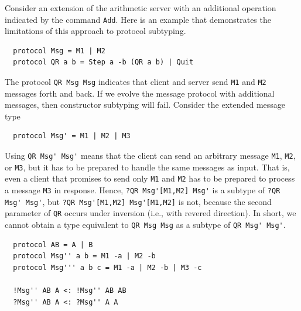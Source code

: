 Consider an extension of the arithmetic server with an additional
operation indicated by the command \lstinline+Add+.
Here is an example that demonstrates the limitations of this approach
to protocol subtyping.
\begin{lstlisting}
  protocol Msg = M1 | M2
  protocol QR a b = Step a -b (QR a b) | Quit
\end{lstlisting}
The protocol \lstinline+QR Msg Msg+ indicates that client and server
send \lstinline+M1+ and \lstinline+M2+ messages forth and back. If we
evolve the message protocol with additional messages, then constructor
subtyping will fail. Consider the extended message type
\begin{lstlisting}
  protocol Msg' = M1 | M2 | M3
\end{lstlisting}
Using \lstinline+QR Msg' Msg'+ means that the client can send an
arbitrary message \lstinline+M1+, \lstinline+M2+, or \lstinline+M3+,
but it has to be prepared to handle the same messages as input. That
is, even a client that promises to send only \lstinline+M1+ and
\lstinline+M2+ has to be prepared to process a message \lstinline+M3+
in response. Hence, \lstinline+?QR Msg'[M1,M2] Msg'+ is a subtype of
\lstinline+?QR Msg' Msg'+, but \lstinline+?QR Msg'[M1,M2] Msg'[M1,M2]+
is not, because the second parameter of \lstinline+QR+ occurs under
inversion (i.e., with revered direction). In short, we cannot obtain a
type equivalent to \lstinline+QR Msg Msg+ as a subtype of
\lstinline+QR Msg' Msg'+.

\begin{lstlisting}
  protocol AB = A | B
  protocol Msg'' a b = M1 -a | M2 -b
  protocol Msg''' a b c = M1 -a | M2 -b | M3 -c

  !Msg'' AB A <: !Msg'' AB AB
  ?Msg'' AB A <: ?Msg'' A A
\end{lstlisting}

